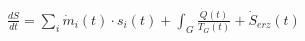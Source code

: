 \( \frac{dS}{dt} = \sum_i \dot{m}_i(t) \cdot s_i(t) + \int_G \frac{\dot{Q}(t)}{T_G(t)} + \dot{S}_{erz}(t) \)